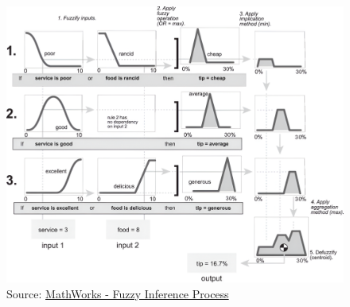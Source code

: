 \documentclass[
	10pt,
	t		%
]{beamer}
\begin{document}
\begin{frame}
	\vspace{-0.8cm}
	\begin{figure}
		\centering
		\caption{\tiny{Source: \href{https://de.mathworks.com/help/fuzzy/fuzzy-inference-process.html}{MathWorks - Fuzzy Inference Process}}}
		\includegraphics[width=0.8\paperwidth]{figures/FullInferenceProcess.png}
	\end{figure}
	\label{fig:fuzzy_inference_full}
	
\end{frame}
\end{document}
